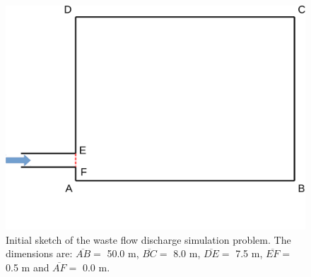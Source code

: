 \documentclass[12pts,a4paper,amsmath,amssymb,floatfix]{article}%
\begin{document}
\begin{enumerate}[label=\bfseries Problem \arabic*:]
\begin{figure}[h]
\begin{center}
\includegraphics[width=13.cm,height=8.cm,clip]{./Pics/Sketch_Prob2b}\vspace{-1.5cm}
\caption{Initial sketch of the waste flow discharge simulation problem. The dimensions are: $\overline{AB}=$ 50.0 m, $\overline{BC}=$ 8.0 m, $\overline{DE}=$ 7.5 m, $\overline{EF}=$ 0.5 m and $\overline{AF}=$ 0.0 m.} \label{EG501V_Assignment:Sketch2}
\end{center}
\end{figure}


\end{enumerate}
\end{document}
